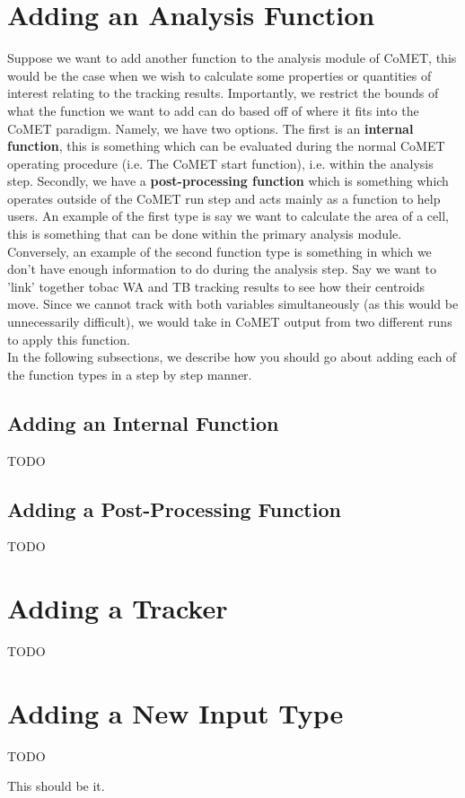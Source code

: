 \documentclass[10pt,a4paper]{article}
\begin{document}
	\section{Adding an Analysis Function}
	Suppose we want to add another function to the analysis module of \ac{CoMET}, this would be the case when we wish to calculate some properties or quantities of interest relating to the tracking results. Importantly, we restrict the bounds of what the function we want to add can do based off of where it fits into the \ac{CoMET} paradigm. Namely, we have two options. The first is an \textbf{internal function}, this is something which can be evaluated during the normal \ac{CoMET} operating procedure (i.e. The \ac{CoMET} start function), i.e. within the analysis step. Secondly, we have a \textbf{post-processing function} which is something which operates outside of the \ac{CoMET} run step and acts mainly as a function to help users. An example of the first type is say we want to calculate the area of a cell, this is something that can be done within the primary analysis module. Conversely, an example of the second function type is something in which we don't have enough information to do during the analysis step. Say we want to 'link' together \ac{tobac} \ac{WA} and \ac{TB} tracking results to see how their centroids move. Since we cannot track with both variables simultaneously (as this would be unnecessarily difficult), we would take in \ac{CoMET} output from two different runs to apply this function.\\
	
	In the following subsections, we describe how you should go about adding each of the function types in a step by step manner.
	
	\subsection{Adding an Internal Function}
	
	TODO
	
	\subsection{Adding a Post-Processing Function}
	
	TODO
	
	\section{Adding a Tracker}
	
	TODO
	
	\section{Adding a New Input Type}
	
	TODO
	
	This should be it.
	
	
\end{document}
